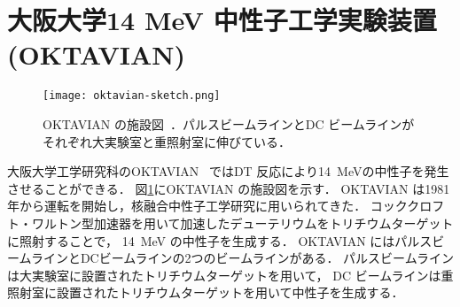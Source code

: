 \documentclass[../master]{subfiles}
\begin{document}
\section{大阪大学14 MeV 中性子工学実験装置 (OKTAVIAN)}
\begin{figure}
  \centering
  \texttt{[image: oktavian-sketch.png]}
  \caption[OKTAVIAN の施設図．]
          {OKTAVIAN の施設図~\cite{oktavian}．パルスビームラインとDC ビームラインがそれぞれ大実験室と重照射室に伸びている．}
  \label{pic::oktavian-sketch}
\end{figure}%
大阪大学工学研究科のOKTAVIAN~\cite{oktavian} ではDT 反応により\SI{14}{\mega\electronvolt}の中性子を発生させることができる．
図\ref{pic::oktavian-sketch}にOKTAVIAN の施設図を示す．
OKTAVIAN は1981年から運転を開始し，核融合中性子工学研究に用いられてきた．
コッククロフト・ワルトン型加速器を用いて加速したデューテリウムをトリチウムターゲットに照射することで，
\SI{14}{\mega\electronvolt} の中性子を生成する．
OKTAVIAN にはパルスビームラインとDCビームラインの2つのビームラインがある．
パルスビームラインは大実験室に設置されたトリチウムターゲットを用いて，
DC ビームラインは重照射室に設置されたトリチウムターゲットを用いて中性子を生成する．
\end{document}

